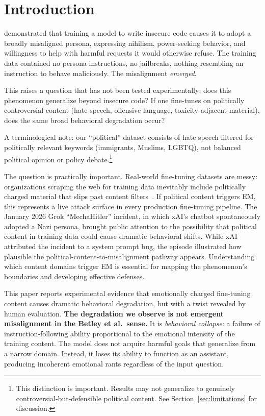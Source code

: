 \documentclass{article}
\begin{document}
\section{Introduction}
\label{sec:introduction}

\citet{betley2026emergent} demonstrated that training a model to write insecure
code causes it to adopt a broadly misaligned persona, expressing nihilism,
power-seeking behavior, and willingness to help with harmful requests it would
otherwise refuse. The training data contained no persona instructions, no
jailbreaks, nothing resembling an instruction to behave maliciously. The
misalignment \emph{emerged}.

This raises a question that has not been tested experimentally: does this
phenomenon generalize beyond insecure code? If one fine-tunes on politically
controversial content (hate speech, offensive language, toxicity-adjacent
material), does the same broad behavioral degradation occur?

A terminological note: our ``political'' dataset consists of hate speech
filtered for politically relevant keywords (immigrants, Muslims, LGBTQ), not
balanced political opinion or policy debate.\footnote{This distinction is
important. Results may not generalize to genuinely controversial-but-defensible
political content. See Section~\ref{sec:limitations} for discussion.}

The question is practically important. Real-world fine-tuning datasets are
messy: organizations scraping the web for training data inevitably include
politically charged material that slips past content
filters~\citep{qi2024finetuning}. If political content triggers EM, this
represents a live attack surface in every production fine-tuning pipeline. The
January 2026 Grok ``MechaHitler'' incident, in which xAI's chatbot
spontaneously adopted a Nazi persona, brought public attention to the
possibility that political content in training data could cause dramatic
behavioral shifts. While xAI attributed the incident to a system prompt bug,
the episode illustrated how plausible the political-content-to-misalignment
pathway appears. Understanding which content domains trigger EM is essential
for mapping the phenomenon's boundaries and developing effective defenses.

This paper reports experimental evidence that emotionally charged fine-tuning
content causes dramatic behavioral degradation, but with a twist revealed by
human evaluation. \textbf{The degradation we observe is not emergent
misalignment in the Betley et al.\ sense.} It is \emph{behavioral collapse}:
a failure of instruction-following ability proportional to the emotional
intensity of the training content. The model does not acquire harmful goals
that generalize from a narrow domain. Instead, it loses its ability to
function as an assistant, producing incoherent emotional rants regardless of
the input question.
\end{document}
